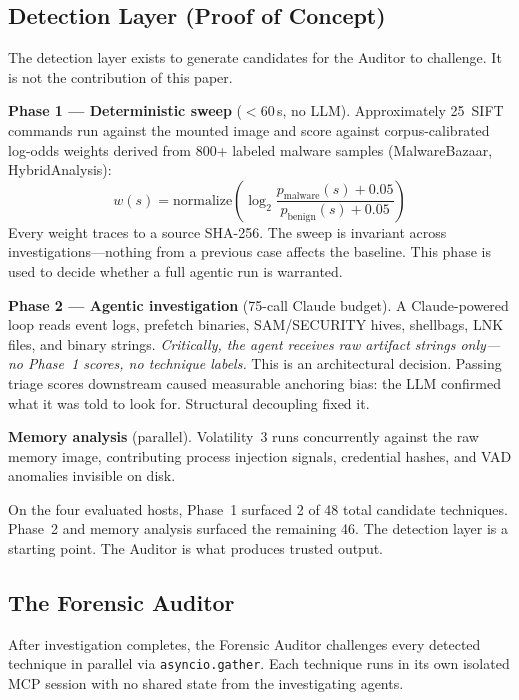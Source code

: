 \documentclass[sigconf, nonacm]{acmart}
\begin{document}
\subsection{Detection Layer (Proof of Concept)}
\label{sec:detection}

The detection layer exists to generate candidates for the Auditor to challenge.
It is not the contribution of this paper.

\textbf{Phase 1 --- Deterministic sweep} ($<$60\,s, no LLM). Approximately
25~SIFT commands run against the mounted image and score against corpus-calibrated
log-odds weights derived from 800+ labeled malware samples (MalwareBazaar,
HybridAnalysis):
\[
  w(s) = \text{normalize}\!\left(\log_2 \frac{p_\text{malware}(s) + 0.05}
                                              {p_\text{benign}(s)  + 0.05}\right)
\]
Every weight traces to a source SHA-256. The sweep is invariant across
investigations---nothing from a previous case affects the baseline. This
phase is used to decide whether a full agentic run is warranted.

\textbf{Phase 2 --- Agentic investigation} (75-call Claude budget). A
Claude-powered loop reads event logs, prefetch binaries, SAM/SECURITY hives,
shellbags, LNK files, and binary strings. \emph{Critically, the agent receives
raw artifact strings only---no Phase~1 scores, no technique labels.} This is an
architectural decision. Passing triage scores downstream caused measurable
anchoring bias: the LLM confirmed what it was told to look for. Structural
decoupling fixed it.

\textbf{Memory analysis} (parallel). Volatility~3 runs concurrently against the
raw memory image, contributing process injection signals, credential hashes, and
VAD anomalies invisible on disk.

On the four evaluated hosts, Phase~1 surfaced 2 of 48 total candidate techniques.
Phase~2 and memory analysis surfaced the remaining 46. The detection layer is a
starting point. The Auditor is what produces trusted output.

\subsection{The Forensic Auditor}
\label{sec:auditor}

After investigation completes, the Forensic Auditor challenges every detected
technique in parallel via \texttt{asyncio.gather}. Each technique runs in its own
isolated MCP session with no shared state from the investigating agents.
\end{document}
